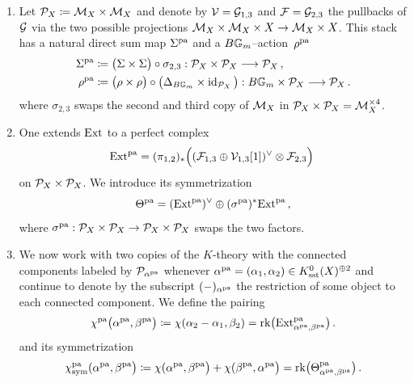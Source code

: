 \documentclass[a4paper, 12pt]{amsart}
\begin{document}
\begin{definition}
\label{def: pairVOA}
\begin{enumerate}
\item Let ${\mathcal P}_X\coloneqq{\mathcal M}_X\times {\mathcal M}_X$ and denote by ${\mathcal V}={\mathcal G}_{1,3}$ and ${\mathcal F}={\mathcal G}_{2,3}$ the pullbacks of ${\mathcal G}$ via the two possible projections ${\mathcal M}_X\times {\mathcal M}_X\times X\to {\mathcal M}_X\times X$. This stack has a natural direct sum map $\Sigma^{\mathop{\rm pa}\nolimits}$ and a $B{\mathbb{G}}_m$--action~$\rho^{\mathop{\rm pa}\nolimits}$
    \begin{align*}
\Sigma^{\mathop{\rm pa}\nolimits}&\coloneqq \big(\Sigma\times \Sigma\big)\circ \sigma_{2,3} : {\mathcal P}_X\times {\mathcal P}_X\longrightarrow {\mathcal P}_X\,,\\
\rho^{\mathop{\rm pa}\nolimits}&\coloneqq \big(\rho\times\rho\big) \circ\big(\Delta_{B{\mathbb{G}}_m}\times \operatorname{id}_{{\mathcal P}_X}\big): B{\mathbb{G}}_m\times {\mathcal P}_X\longrightarrow {\mathcal P}_X\,.
\end{align*}
where $\sigma_{2,3}$ swaps the second and third copy of ${\mathcal M}_X$ in ${\mathcal P}_X\times {\mathcal P}_X={\mathcal M}_X^{\times 4}$. 
\item One extends $\textup{Ext}$ to a perfect complex 
    \begin{equation}
    \label{Eq: Extpacomplex}
    \textup{Ext}^{\mathop{\rm pa}\nolimits} = (\pi_{1,2})_\ast\Big(({\mathcal F}_{1,3}\oplus {\mathcal V}_{1,3}[1])^\vee\otimes {\mathcal F}_{2,3}\Big)\,
    \end{equation}
on ${\mathcal P}_X\times {\mathcal P}_X$.
We introduce its symmetrization
$$
\Theta^{\mathop{\rm pa}\nolimits} = (\textup{Ext}^{\mathop{\rm pa}\nolimits})^\vee \oplus (\sigma^{\mathop{\rm pa}\nolimits})^\ast\textup{Ext}^{\mathop{\rm pa}\nolimits}\,,
$$
where $\sigma^{\mathop{\rm pa}\nolimits}:{\mathcal P}_X\times {\mathcal P}_X\to {\mathcal P}_X\times {\mathcal P}_X$ swaps the two factors. 


\item We now work with two copies of the $K$-theory  with the connected components labeled by ${\mathcal P}_{\alpha^{\mathop{\rm pa}\nolimits}}$ whenever $\alpha^{\mathop{\rm pa}\nolimits}=(\alpha_1,\alpha_ 2)\in K_{\text{sst}}^0(X)^{\oplus 2}$ and continue to denote by the subscript $(-)_{\alpha^{\mathop{\rm pa}\nolimits}}$ the restriction of some object to each connected component. We  define the pairing 
\begin{align*}
\label{Eq: pairing}
\chi^{\mathop{\rm pa}\nolimits}\big(\alpha^{\mathop{\rm pa}\nolimits},\beta^{\mathop{\rm pa}\nolimits}\big) \coloneqq \chi(\alpha_2 -\alpha_1,\beta_2) =\mathrm{rk}\big(\textup{Ext}^{\mathop{\rm pa}\nolimits}_{\alpha^{\mathop{\rm pa}\nolimits},\beta^{\mathop{\rm pa}\nolimits}}\big) \,.
\end{align*}
and its symmetrization
\begin{equation*}\label{Eq: pairing}
\chi^{\mathop{\rm pa}\nolimits}_{\text{sym}}(\alpha^{\mathop{\rm pa}\nolimits},\beta^{\mathop{\rm pa}\nolimits}\big) \coloneqq \chi(\alpha^{\mathop{\rm pa}\nolimits},\beta^{\mathop{\rm pa}\nolimits}\big)+ \chi(\beta^{\mathop{\rm pa}\nolimits}, \alpha^{\mathop{\rm pa}\nolimits}\big)=\mathrm{rk}\big(\Theta^{\mathop{\rm pa}\nolimits}_{\alpha^{\mathop{\rm pa}\nolimits},\beta^{\mathop{\rm pa}\nolimits}}\big) \,.
\end{equation*}
\end{enumerate}
\end{definition}
\end{document}
